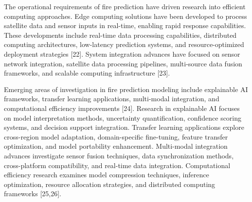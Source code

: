 The operational requirements of fire prediction have driven research into efficient computing approaches. Edge computing solutions have been developed to process satellite data and sensor inputs in real-time, enabling rapid response capabilities. These developments include real-time data processing capabilities, distributed computing architectures, low-latency prediction systems, and resource-optimized deployment strategies [22]. System integration advances have focused on sensor network integration, satellite data processing pipelines, multi-source data fusion frameworks, and scalable computing infrastructure [23].

Emerging areas of investigation in fire prediction modeling include explainable AI frameworks, transfer learning applications, multi-modal integration, and computational efficiency improvements [24]. Research in explainable AI focuses on model interpretation methods, uncertainty quantification, confidence scoring systems, and decision support integration. Transfer learning applications explore cross-region model adaptation, domain-specific fine-tuning, feature transfer optimization, and model portability enhancement. Multi-modal integration advances investigate sensor fusion techniques, data synchronization methods, cross-platform compatibility, and real-time data integration. Computational efficiency research examines model compression techniques, inference optimization, resource allocation strategies, and distributed computing frameworks [25,26].